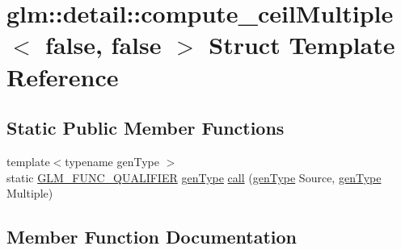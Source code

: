 \hypertarget{structglm_1_1detail_1_1compute__ceil_multiple_3_01false_00_01false_01_4}{}\section{glm\+:\+:detail\+:\+:compute\+\_\+ceil\+Multiple$<$ false, false $>$ Struct Template Reference}
\label{structglm_1_1detail_1_1compute__ceil_multiple_3_01false_00_01false_01_4}
\subsection*{Static Public Member Functions}
\begin{DoxyCompactItemize}
\item 
{\footnotesize template$<$typename gen\+Type $>$ }\\static \hyperlink{setup_8hpp_a33fdea6f91c5f834105f7415e2a64407}{G\+L\+M\+\_\+\+F\+U\+N\+C\+\_\+\+Q\+U\+A\+L\+I\+F\+I\+ER} \hyperlink{structglm_1_1detail_1_1gen_type}{gen\+Type} \hyperlink{structglm_1_1detail_1_1compute__ceil_multiple_3_01false_00_01false_01_4_a42251f23ffbe25b624948a1128aa9957}{call} (\hyperlink{structglm_1_1detail_1_1gen_type}{gen\+Type} Source, \hyperlink{structglm_1_1detail_1_1gen_type}{gen\+Type} Multiple)
\end{DoxyCompactItemize}


\subsection{Member Function Documentation}
\mbox{\label{structglm_1_1detail_1_1compute__ceil_multiple_3_01false_00_01false_01_4_a42251f23ffbe25b624948a1128aa9957}} 

